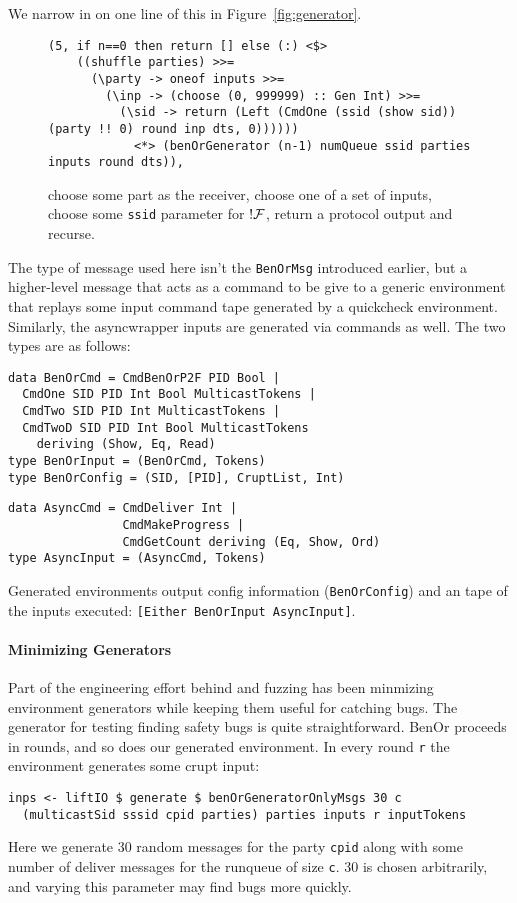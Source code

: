 We narrow in on one line of this in Figure~\ref{fig:generator}.
\begin{figure*}
\begin{lstlisting}
(5, if n==0 then return [] else (:) <$> 
    ((shuffle parties) >>= 
      (\party -> oneof inputs >>= 
        (\inp -> (choose (0, 999999) :: Gen Int) >>= 
          (\sid -> return (Left (CmdOne (ssid (show sid)) (party !! 0) round inp dts, 0)))))) 
            <*> (benOrGenerator (n-1) numQueue ssid parties inputs round dts)),
\end{lstlisting}
\caption{choose some part as the receiver, choose one of a set of inputs, choose some \texttt{ssid} parameter for $!\mathcal{F}$, return a protocol output and recurse.}
\end{figure*}
The type of message used here isn't the \texttt{BenOrMsg} introduced earlier, but a higher-level message that acts as a command to be give to a generic environment that replays some input command tape generated by a quickcheck environment.
Similarly, the asyncwrapper inputs are generated via commands as well. The two types are as follows:
\begin{lstlisting}
data BenOrCmd = CmdBenOrP2F PID Bool | 
  CmdOne SID PID Int Bool MulticastTokens | 
  CmdTwo SID PID Int MulticastTokens | 
  CmdTwoD SID PID Int Bool MulticastTokens 
    deriving (Show, Eq, Read)
type BenOrInput = (BenOrCmd, Tokens)
type BenOrConfig = (SID, [PID], CruptList, Int)
\end{lstlisting}
\begin{lstlisting}
data AsyncCmd = CmdDeliver Int | 
                CmdMakeProgress | 
                CmdGetCount deriving (Eq, Show, Ord)
type AsyncInput = (AsyncCmd, Tokens)
\end{lstlisting}
Generated environments output config information (\texttt{BenOrConfig}) and an tape of the inputs executed: \texttt{[Either BenOrInput AsyncInput]}. 

\paragraph{Minimizing Generators}
Part of the engineering effort behind \us and fuzzing has been minmizing environment generators while keeping them useful for catching bugs.
The generator for testing finding safety bugs is quite straightforward.
BenOr proceeds in rounds, and so does our generated environment. 
In every round \texttt{r} the environment generates some crupt input:
\begin{lstlisting}
inps <- liftIO $ generate $ benOrGeneratorOnlyMsgs 30 c 
  (multicastSid sssid cpid parties) parties inputs r inputTokens
\end{lstlisting}
Here we generate 30 random messages for the party \texttt{cpid} along with some number of deliver messages for the runqueue of size \texttt{c}.
30 is chosen arbitrarily, and varying this parameter may find bugs more quickly.

